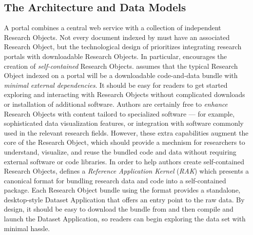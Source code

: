 \documentclass[11pt,letterpaper]{article}
\begin{document}
\subsection{The {\lMOSAIC} Architecture and Data Models}
A {\MOSAIC} portal combines a central web service with a 
collection of independent Research Objects.  Not every 
document indexed by {\MOSAIC} must have an associated 
Research Object, but the technological design of 
{\MOSAIC} prioritizes integrating research portals 
with downloadable Research Objects.
\p{}
In particular, {\MOSAIC} encourages the 
creation of \textit{self-contained} Research Objects.  
{\MOSAIC} assumes that the 
typical Research Object indexed on a {\MOSAIC} portal 
will be a downloadable code-and-data bundle 
with \textit{minimal external dependencies}.  
It should be easy for readers to get 
started exploring and interacting with Research Objects 
without complicated downloads or installation of 
additional software.  Authors are certainly free 
to \textit{enhance} Research Objects with 
content tailord to specialized software --- for 
example, sophisticated data visualization features, 
or integration with software commonly used in the 
relevant research fields.  However, these extra capabilities 
augment the core of the Research Object, which should 
provide a mechnism for researchers to understand, 
visualize, and reuse the bundled code and data without 
requiring external software or code libraries.
\p{}
In order to help authors create self-contained 
Research Objects, {\MOSAIC} defines a 
\textit{Reference Application Kernel} (\textit{RAK}) 
which presents a canonical format for bundling 
research data and code into a self-contained 
package.   
Each Research Object bundle using 
the {\RAK} format provides a standalone, desktop-style 
Dataset Application that offers an entry point to 
the raw data.  By design, it should be easy 
to download the {\RAK} bundle from {\MOSAIC} and 
then compile and launch the Dataset Application, so 
readers can begin exploring the data set with 
minimal hassle.  
\end{document}
